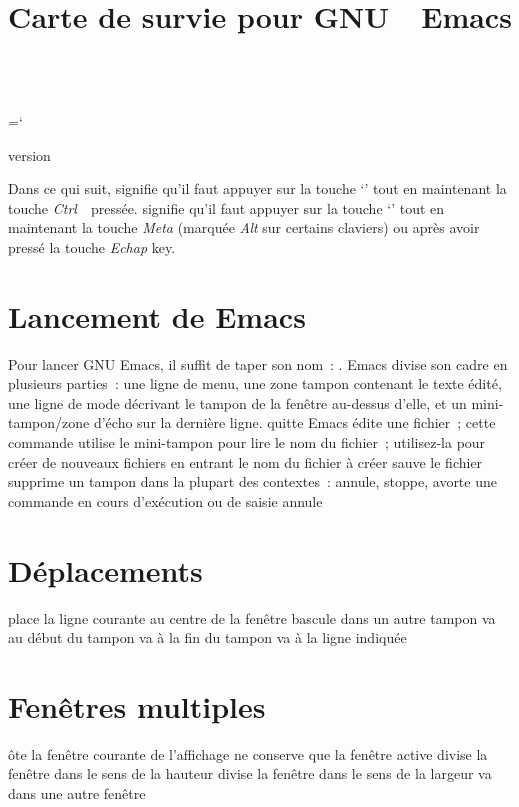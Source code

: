 \chardef\\=`\\

\raggedright
\nopagenumbers
\parindent 0pt
\hoffset -0.2in



\title{Carte de survie pour GNU\ \ Emacs}{version \versionemacs}

Dans ce qui suit,  signifie qu'il faut appuyer sur la touche
`' tout en maintenant la touche {\it Ctrl}\ \
press\'ee.  signifie qu'il faut appuyer sur la touche
`\kbd{z}' tout en maintenant la touche {\it Meta\/} (marqu\'ee {\it Alt\/}
sur certains claviers) ou apr\`es avoir press\'e la touche {\it Echap\/} key.

\section{Lancement de Emacs}

Pour lancer GNU Emacs, il suffit de taper son nom~: .
Emacs divise son cadre en plusieurs parties~:
  une ligne de menu,
  une zone tampon contenant le texte \'edit\'e,
  une ligne de mode d\'ecrivant le tampon de la fen\^etre au-dessus d'elle,
  et un mini-tampon/zone d'\'echo sur la derni\`ere ligne.
\askip
{} quitte Emacs
 \'edite une fichier~; cette commande utilise le
mini-tampon pour lire le nom du fichier~; utilisez-la pour cr\'eer de
nouveaux fichiers en entrant le nom du fichier \`a cr\'eer
 sauve le fichier
 supprime un tampon
 dans la plupart des contextes~: annule, stoppe, avorte une
commande en cours d'ex\'ecution ou de saisie
 annule

\section{D\'eplacements}

 place la ligne courante au centre de la fen\^etre
 bascule dans un autre tampon
 va au d\'ebut du tampon
 va \`a la fin du tampon
 va \`a la ligne indiqu\'ee

\section{Fen\^etres multiples}

 \^ote la fen\^etre courante de l'affichage
 ne conserve que la fen\^etre active
 divise la fen\^etre dans le sens de la hauteur
 divise la fen\^etre dans le sens de la largeur
 va dans une autre fen\^etre

